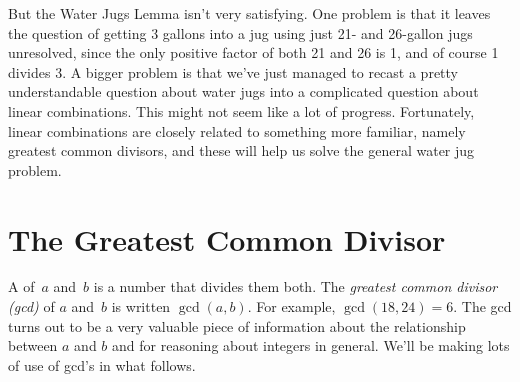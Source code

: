 But the Water Jugs Lemma isn't very satisfying.  One problem is that it leaves the question
of getting 3 gallons into a jug using just 21- and 26-gallon jugs unresolved, since the
only positive factor of both 21 and 26 is 1, and of course 1 divides 3.  A bigger problem
is that we've just managed to recast a pretty understandable question about water jugs into
a complicated question about linear combinations.  This might not seem like a lot of
progress.  Fortunately, linear combinations are closely related to something more familiar,
namely greatest common divisors, and these will help us solve the general water jug
problem.

\begin{problems}
\practiceproblems
{}

\classproblems
{}

\end{problems}

\section{The Greatest Common Divisor}\label{sec:gcd}

A  of~$a$ and~$b$ is a number that divides them both.  The
\emph{greatest common divisor (gcd)} of $a$ and~$b$ is written $\gcd(a, b)$.  For example,
$\gcd(18, 24) = 6$.  The gcd turns out to be a very valuable piece of information about the
relationship between $a$ and $b$ and for reasoning about integers in general.  We'll be
making lots of use of gcd's in what follows.

